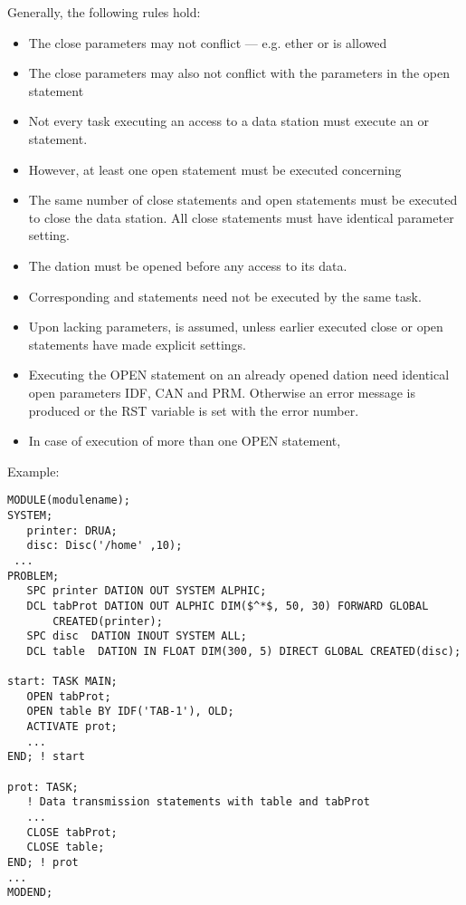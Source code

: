 Generally, the following rules hold:
\begin{itemize}
\item The close parameters may not conflict --- e.g. ether  or  is allowed
\item The close parameters may also not conflict with the parameters in the open statement
\item Not every task executing an access to a data station must execute
an  or  statement.
\item However, at least one open statement must be executed concerning
\item The same number of close statements and open statements must
be executed to close the data station.
All close statements must have identical parameter setting.
\item The dation must be opened before any access to its data.

\item Corresponding  and  statements need not be executed by
the same task.
\item Upon lacking parameters,  is assumed, unless earlier
executed close or open statements have made explicit settings.
\item
Executing the OPEN statement on an already opened dation need identical 
open parameters IDF, CAN and PRM. Otherwise an error message is produced
or the RST variable is set with the error number.
\item In case of execution of more than one OPEN statement, 
\end{itemize}

Example:
\label{example}

\begin{lstlisting}
MODULE(modulename);
SYSTEM;
   printer: DRUA;
   disc: Disc('/home' ,10);
 ... 
PROBLEM;
   SPC printer DATION OUT SYSTEM ALPHIC;
   DCL tabProt DATION OUT ALPHIC DIM($^*$, 50, 30) FORWARD GLOBAL
       CREATED(printer);
   SPC disc  DATION INOUT SYSTEM ALL;
   DCL table  DATION IN FLOAT DIM(300, 5) DIRECT GLOBAL CREATED(disc);

start: TASK MAIN;
   OPEN tabProt;
   OPEN table BY IDF('TAB-1'), OLD;
   ACTIVATE prot;
   ...
END; ! start

prot: TASK;
   ! Data transmission statements with table and tabProt
   ...
   CLOSE tabProt;
   CLOSE table; 
END; ! prot 
... 
MODEND;
\end{lstlisting}

